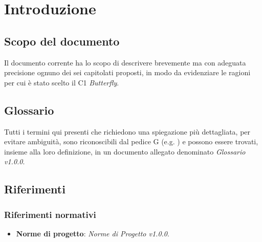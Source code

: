 \section{Introduzione} \label{introduzione}
    \subsection{Scopo del documento}
    Il documento corrente ha lo scopo di descrivere brevemente ma con adeguata precisione ognuno dei sei capitolati proposti,
    in modo da evidenziare le ragioni per cui è stato scelto il  C1 \textit{Butterfly}.

    \subsection{Glossario}
    Tutti i termini qui presenti che richiedono una spiegazione più dettagliata, per evitare ambiguit\`a,
    sono riconoscibili dal pedice G (e.g. )
    e possono essere trovati, insieme alla loro definizione, in un documento allegato denominato \textit{Glossario v1.0.0}\DAlt.

    \subsection{Riferimenti}

        \subsubsection{Riferimenti normativi}
            \begin{itemize}
                \item \textbf{Norme di progetto}: \textit{Norme di Progetto v1.0.0}\DAlt.
            \end{itemize}

